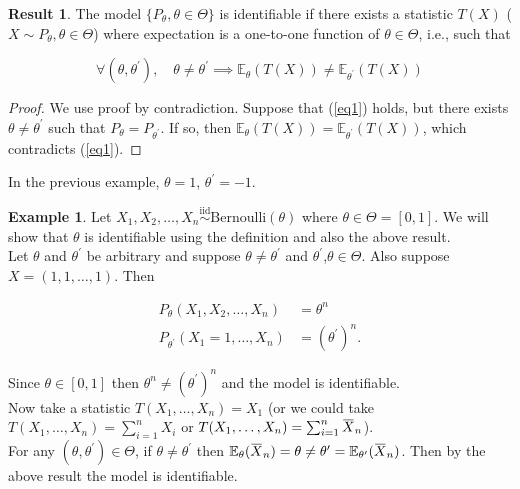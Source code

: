 \documentclass[12pt]{article}
\newcommand{\overbar}[1]{\mkern 1.5mu\overline{\mkern-1.5mu#1\mkern-1.5mu}\mkern 1.5mu}
\theoremstyle{definition}
\newtheorem*{example}{Example}
\newtheorem*{result}{Result}
\begin{document}
\begin{result}
The model $\{P_{\theta}, \theta \in \Theta \}$ is identifiable if there exists 
a statistic $T(X)$ ($X \sim P_{\theta}, \theta \in \Theta$) where 
expectation is a one-to-one function of $\theta \in \Theta$, i.e., such that

\begin{equation}\label{eq1}
\forall (\theta, \theta^{\prime}), \quad \theta \neq \theta^{\prime} \implies 
\mathbb{E}_{\theta}(T(X)) \neq \mathbb{E}_{\theta^{\prime}}(T(X))
\end{equation}

\begin{proof}
We use proof by contradiction. Suppose that (\ref{eq1}) holds, but there
exists $\theta \neq \theta^{\prime}$ such that $P_{\theta} = P_{\theta^{\prime}}$.
If so, then $\mathbb{E}_{\theta}(T(X)) = \mathbb{E}_{\theta^{\prime}}(T(X))$,
which contradicts (\ref{eq1}).
\end{proof}
\end{result}


In the previous example, $\theta = 1$, $\theta^{\prime} = -1$.

\begin{example}
Let $X_1, X_2, \ldots, X_n \overset{\mathrm{iid}}{\sim} \text{Bernoulli}(\theta)$
where $\theta \in \Theta = [0, 1]$. We will show that $\theta$ is identifiable
using the definition and also the above result.\\

Let $\theta$ and $\theta^{\prime}$ be arbitrary and suppose 
$\theta \neq \theta^{\prime}$ and $\theta^{\prime}$,$\theta \in \Theta$. Also
suppose $X = (1, 1, \ldots, 1)$. Then

\begin{align*}
P_{\theta}(X_1, X_2, \ldots, X_n) &= \theta^{n}\\
P_{\theta^{\prime}}(X_1 = 1, \ldots, X_n) &= (\theta^{\prime})^{n}.
\end{align*}

Since $\theta \in [0,1]$ then $\theta^n \neq (\theta^{\prime})^n$ and the model
is identifiable.\\

Now take a statistic $T(X_1, \ldots, X_n) = X_1$ (or we could take 
$T(X_1, \ldots, X_n) = \sum^{n}_{i=1} X_i$ or
$T(X_1, \ldots, X_n) = \sum^{n}_{i=1} \overbar{X}_n$).\\

For any 
$(\theta, \theta^{\prime}) \in \Theta$, if $\theta \neq \theta^{\prime}$
then $\mathbb{E}_{\theta}(\overbar{X}_n) = \theta \neq \theta^{\prime} = 
\mathbb{E}_{\theta^{\prime}}(\overbar{X}_n)$. Then by the above result
the model is identifiable.
\end{example}
\end{document}
